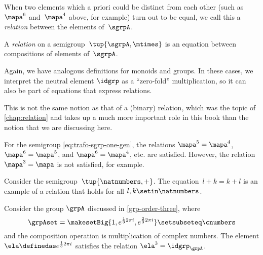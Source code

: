 When two elements which a priori could be distinct from each other (such as~$\mapa^6$ and~$\mapa^4$ above, for example) turn out to be equal, we call this a \emph{relation} between the elements of~$\sgrpA$.

\begin{ctdefinition}
    A \emph{relation} on a semigroup~$\tup{\sgrpA, \mtimes}$ is an equation between compositions of elements of~$\sgrpA$.
\end{ctdefinition}

\begin{remark}
    Again, we have analogous definitions for monoids and groups.
    In these cases, we interpret the neutral element $\idgrp$ as a ``zero-fold'' multiplication, so it can also be part of equations that express relations.
\end{remark}

\begin{remark}
    This is not the same notion as that of a (binary) relation, which was the topic of \cref{chap:relation} and takes up a much more important role in this book than the notion that we are discussing here.
\end{remark}

\begin{example}
    For the semigroup \cref{eq:trafo-sgrp-one-gen}, the relations $\mapa^5 = \mapa^4$, $\mapa^6 = \mapa^5$, and $\mapa^6 = \mapa^4$, etc. are satisfied.
    However, the relation $\mapa^3 = \mapa$ is not satisfied, for example.

\end{example}

\begin{example}
    Consider the semigroup~$\tup{\natnumbers, +}$.
    The equation~$l + k = k + l$ is an example of a relation that holds for all $l, k \setin \natnumbers$.
\end{example}

\begin{example}
    Consider the group $\grpA$ discussed in \cref{grp-order-three}, where
    \begin{equation}
        \grpAset = \makesetBig{ 1, e^{\frac{1}{3}2\pi i}, e^{\frac{2 }{3}2\pi i} } \setsubseteq \cnumbers
    \end{equation}
    and the composition operation is multiplication of complex numbers.
    The element $\ela \definedas e^{\frac{1}{3}2\pi i}$ satisfies the relation $\ela^3 = \idgrp_\grpA$.
\end{example}

